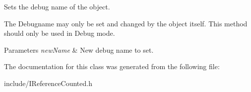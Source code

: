Sets the debug name of the object. 

The Debugname may only be set and changed by the object itself. This method should only be used in Debug mode. 
\begin{DoxyParams}{Parameters}
{\em new\+Name} & New debug name to set. \\
\hline
\end{DoxyParams}


The documentation for this class was generated from the following file\+:\begin{DoxyCompactItemize}
\item 
include/I\+Reference\+Counted.\+h\end{DoxyCompactItemize}
